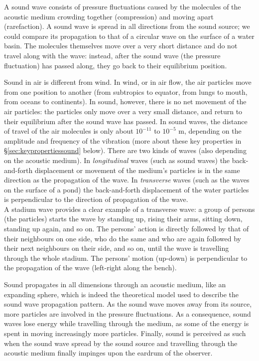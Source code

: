 \documentclass[
]{book}
\begin{document}
A sound wave consists of pressure fluctuations caused by the molecules of the acoustic medium crowding together (compression) and moving apart (rarefaction). A sound wave is spread in all directions from the sound source; we could compare its propagation to that of a circular wave on the surface of a water basin. The molecules themselves move over a very short distance and do not travel along with the wave: instead, after the sound wave (the pressure fluctuation) has passed along, they go back to their equilibrium position.

Sound in air is different from wind. In wind, or in air flow, the air particles move from one position to another (from subtropics to equator, from lungs to mouth, from oceans to continents). In sound, however, there is no net movement of the air particles: the particles only move over a very small distance, and return to their equilibrium after the sound wave has passed. In sound waves, the distance of travel of the air molecules is only about \(10^{-11}\) to \(10^{-5}\) m, depending on the amplitude and frequency of the vibration (more about these key properties in §\ref{sec:keypropertiessound} below).
There are two kinds of waves (also depending on the acoustic medium). In \emph{longitudinal} waves (such as sound waves) the back-and-forth displacement or movement of the medium's particles is in the same direction as the propagation of the wave. In \emph{transverse} waves (such as the waves on the surface of a pond) the back-and-forth displacement of the water particles is perpendicular to the direction of propagation of the wave.\\
A stadium wave provides a clear example of a transverse wave: a group of persons (the particles) starts the wave by standing up, rising their arms, sitting down, standing up again, and so on. The persons' action is directly followed by that of their neighbours on one side, who do the same and who are again followed by their next neighbours on their side, and so on, until the wave is travelling through the whole stadium. The persons' motion (up-down) is perpendicular to the propagation of the wave (left-right along the bench).

Sound propagates in all dimensions through an acoustic medium, like an expanding sphere, which is indeed the theoretical model used to describe the sound wave propagation pattern. As the sound wave moves away from its source, more particles are involved in the pressure fluctuations. As a consequence, sound waves lose energy while travelling through the medium, as some of the energy is spent in moving increasingly more particles. Finally, sound is perceived as such when the sound wave spread by the sound source and travelling through the acoustic medium finally impinges upon the eardrum of the observer.
\end{document}
